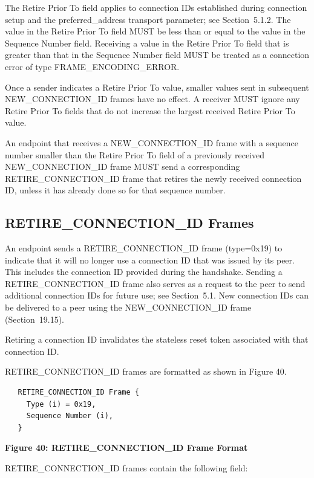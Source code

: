 \documentclass{article}
\begin{document}
The Retire Prior To field applies to connection IDs established during connection setup and the preferred\_address transport parameter; see Section~5.1.2.  The value in the Retire Prior To field MUST be less than or equal to the value in the Sequence Number field. Receiving a value in the Retire Prior To field that is greater than that in the Sequence Number field MUST be treated as a connection error of type FRAME\_ENCODING\_ERROR.

Once a sender indicates a Retire Prior To value, smaller values sent in subsequent NEW\_CONNECTION\_ID frames have no effect.  A receiver MUST ignore any Retire Prior To fields that do not increase the largest received Retire Prior To value.

An endpoint that receives a NEW\_CONNECTION\_ID frame with a sequence number smaller than the Retire Prior To field of a previously received NEW\_CONNECTION\_ID frame MUST send a corresponding RETIRE\_CONNECTION\_ID frame that retires the newly received connection ID, unless it has already done so for that sequence number.

\subsection{RETIRE\_CONNECTION\_ID Frames}

An endpoint sends a RETIRE\_CONNECTION\_ID frame (type=0x19) to indicate that it will no longer use a connection ID that was issued by its peer.  This includes the connection ID provided during the handshake.  Sending a RETIRE\_CONNECTION\_ID frame also serves as a request to the peer to send additional connection IDs for future use; see Section~5.1.  New connection IDs can be delivered to a peer using the NEW\_CONNECTION\_ID frame (Section~19.15).

Retiring a connection ID invalidates the stateless reset token associated with that connection ID.

RETIRE\_CONNECTION\_ID frames are formatted as shown in Figure 40.

\begin{verbatim}
   RETIRE_CONNECTION_ID Frame {
     Type (i) = 0x19,
     Sequence Number (i),
   }
\end{verbatim}

\begin{center}
\textbf{Figure 40: RETIRE\_CONNECTION\_ID Frame Format}
\end{center}

RETIRE\_CONNECTION\_ID frames contain the following field:
\end{document}
